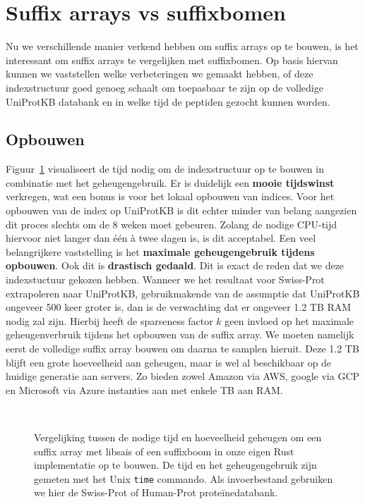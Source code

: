 \section{Suffix arrays vs suffixbomen}\label{sec:performantie}
Nu we verschillende manier verkend hebben om suffix arrays op te bouwen, is het interessant om suffix arrays te vergelijken met suffixbomen.
Op basis hiervan kunnen we vaststellen welke verbeteringen we gemaakt hebben, of deze indexstructuur goed genoeg schaalt om toepasbaar te zijn op de volledige UniProtKB databank en in welke tijd de peptiden gezocht kunnen worden.

\subsection{Opbouwen}\label{subsec:opbouwen}
Figuur~\ref{fig:array_building} visualiseert de tijd nodig om de indexstructuur op te bouwen in combinatie met het geheugengebruik.
Er is duidelijk een \textbf{mooie tijdswinst} verkregen, wat een bonus is voor het lokaal opbouwen van indices.
Voor het opbouwen van de index op UniProtKB is dit echter minder van belang aangezien dit proces slechts om de 8 weken moet gebeuren.
Zolang de nodige CPU-tijd hiervoor niet langer dan één à twee dagen is, is dit acceptabel.
Een veel belangrijkere vaststelling is het \textbf{maximale geheugengebruik tijdens opbouwen}.
Ook dit is \textbf{drastisch gedaald}.
Dit is exact de reden dat we deze indexstuctuur gekozen hebben.
Wanneer we het resultaat voor Swiss-Prot extrapoleren naar UniProtKB, gebruikmakende van de assumptie dat UniProtKB ongeveer 500 keer groter is, dan is de verwachting dat er ongeveer 1.2 TB RAM nodig zal zijn.
Hierbij heeft de sparseness factor $k$ geen invloed op het maximale geheugenverbruik tijdens het opbouwen van de suffix array.
We moeten namelijk eerst de volledige suffix array bouwen om daarna te samplen hieruit.
Deze 1.2 TB blijft een grote hoeveelheid aan geheugen, maar is wel al beschikbaar op de huidige generatie aan servers.
Zo bieden zowel Amazon via AWS, google via GCP en Microsoft via Azure instanties aan met enkele TB aan RAM\@.

\begin{figure}[H]
    \centering
    \\[4ex] %

    \caption{Vergelijking tussen de nodige tijd en hoeveelheid geheugen om een suffix array met libsais of een suffixboom in onze eigen Rust implementatie op te bouwen. De tijd en het geheugengebruik zijn gemeten met het Unix \texttt{time} commando. Als invoerbestand gebruiken we hier de Swiss-Prot of Human-Prot proteïnedatabank.}\label{fig:array_building}
\end{figure}

